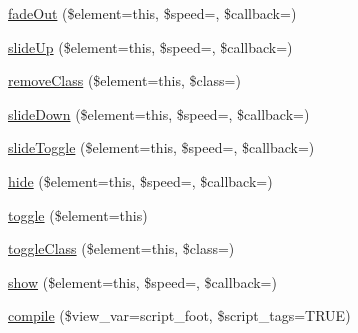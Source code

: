 \begin{DoxyCompactItemize}
\item 
\mbox{\hyperlink{class_c_i___javascript_abb871c6254e5497a57bfaee388ca7f5a}{fade\+Out}} (\$element=\textquotesingle{}this\textquotesingle{}, \$speed=\textquotesingle{}\textquotesingle{}, \$callback=\textquotesingle{}\textquotesingle{})
\item 
\mbox{\hyperlink{class_c_i___javascript_a8e792efa4c914f924248f14650d4244c}{slide\+Up}} (\$element=\textquotesingle{}this\textquotesingle{}, \$speed=\textquotesingle{}\textquotesingle{}, \$callback=\textquotesingle{}\textquotesingle{})
\item 
\mbox{\hyperlink{class_c_i___javascript_a19763bb9f96f2c1b812fe67d2a3bda9f}{remove\+Class}} (\$element=\textquotesingle{}this\textquotesingle{}, \$class=\textquotesingle{}\textquotesingle{})
\item 
\mbox{\hyperlink{class_c_i___javascript_ae1d710449869146767d830dda3f91541}{slide\+Down}} (\$element=\textquotesingle{}this\textquotesingle{}, \$speed=\textquotesingle{}\textquotesingle{}, \$callback=\textquotesingle{}\textquotesingle{})
\item 
\mbox{\hyperlink{class_c_i___javascript_a8a6e8237edbb5248e8ae768bd4632e75}{slide\+Toggle}} (\$element=\textquotesingle{}this\textquotesingle{}, \$speed=\textquotesingle{}\textquotesingle{}, \$callback=\textquotesingle{}\textquotesingle{})
\item 
\mbox{\hyperlink{class_c_i___javascript_a85e5b16273718b1b48d68b55cd8c2942}{hide}} (\$element=\textquotesingle{}this\textquotesingle{}, \$speed=\textquotesingle{}\textquotesingle{}, \$callback=\textquotesingle{}\textquotesingle{})
\item 
\mbox{\hyperlink{class_c_i___javascript_a318cb8671e9e1fffad49e36917c6a119}{toggle}} (\$element=\textquotesingle{}this\textquotesingle{})
\item 
\mbox{\hyperlink{class_c_i___javascript_a7e06f40cce1ddd4d4de4afd787d0f48e}{toggle\+Class}} (\$element=\textquotesingle{}this\textquotesingle{}, \$class=\textquotesingle{}\textquotesingle{})
\item 
\mbox{\hyperlink{class_c_i___javascript_a69608e12e4928d2edd7961cc54627f94}{show}} (\$element=\textquotesingle{}this\textquotesingle{}, \$speed=\textquotesingle{}\textquotesingle{}, \$callback=\textquotesingle{}\textquotesingle{})
\item 
\mbox{\hyperlink{class_c_i___javascript_a561a2547f5b810ee0c0e34fd9c330c51}{compile}} (\$view\+\_\+var=\textquotesingle{}script\+\_\+foot\textquotesingle{}, \$script\+\_\+tags=T\+R\+UE)
\item 

\end{DoxyCompactItemize}
